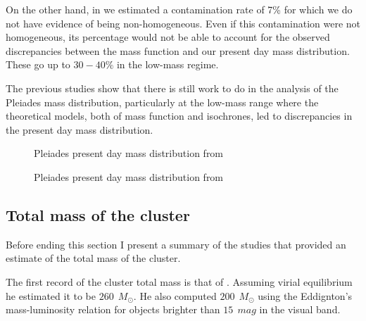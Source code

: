 On the other hand, in \citet{Bouy2015} we estimated a contamination rate of 7\% for which we do not have evidence of being non-homogeneous. Even if this contamination were not homogeneous, its percentage would not be able to account for the observed discrepancies between the \citet{Chabrier2005} mass function and our present day mass distribution. These go up to $30-40\%$ in the low-mass regime.

The previous studies show that there is still work to do in the analysis of the Pleiades mass distribution, particularly at the low-mass range where the theoretical models, both of mass function and isochrones, led to discrepancies in the present day mass distribution.  

\begin{figure}[htbp]
\begin{center}
\caption{Pleiades present day mass distribution  from \citet{Lodieu2012}}
\label{fig:massLodieu}
\end{center}
\end{figure}

\begin{figure}[htbp]
\begin{center}
\caption{Pleiades present day mass distribution  from \citet{Bouy2015}}
\label{fig:massBouy}
\end{center}
\end{figure}

\subsection{Total mass of the cluster}
Before ending this section I present a summary of the studies that provided an estimate of the total mass of the cluster.

The first record of the cluster total mass is that of \citet{1938AJ.....47...25T}. Assuming virial equilibrium he estimated it to be $260 \ \ M_{\odot}$. He also computed $200 \ \ M_{\odot}$ using the Eddignton's mass-luminosity relation for objects brighter than $15 \ \ mag$ in the visual band.

